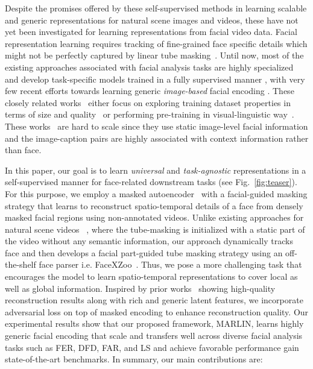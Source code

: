 \documentclass[10pt,twocolumn,letterpaper]{article}
\begin{document}
Despite the promises offered by these self-supervised methods in learning scalable and generic representations for natural scene images and videos, these have not yet been investigated for learning representations from facial video data. Facial representation learning requires tracking of  fine-grained face specific details which might not be perfectly captured by linear tube masking~\cite{tongVideoMAE2022}. Until now, most of the existing approaches associated with facial analysis tasks are highly specialized and develop task-specific models trained in a fully supervised manner \cite{schroffFaceNet2015,parkhiDeep2015,korshunovDeepFakes2018}, with very few recent efforts towards learning generic \textit{image-based} facial encoding \cite{zhengGeneral2022,bulatPretraining2022}. These closely related works~\cite{bulatPretraining2022,zhengGeneral2022} either focus on exploring training dataset properties in terms of size and quality~\cite{bulatPretraining2022} or performing pre-training in visual-linguistic way~\cite{zhengGeneral2022}. These works~\cite{bulatPretraining2022,zhengGeneral2022} are hard to scale since they use static image-level facial information and the image-caption pairs are highly associated with context information rather than face.

In this paper, our goal is to learn \textit{universal} and \textit{task-agnostic} representations in a self-supervised manner for face-related downstream tasks (see Fig.~\ref{fig:teaser}). For this purpose, we employ a masked autoencoder~\cite{heMasked2022,tongVideoMAE2022} with a facial-guided masking strategy that learns to reconstruct spatio-temporal details of a face from densely masked facial regions using non-annotated videos. Unlike existing approaches for natural scene videos ~\cite{tongVideoMAE2022}, where the tube-masking is initialized with a static part of the video without any semantic information, our approach dynamically tracks face and then develops a facial part-guided tube masking strategy using an off-the-shelf face parser i.e. FaceXZoo~\cite{wangFaceXZoo2021}. Thus, we pose a more challenging task that encourages the model to learn spatio-temporal representations to cover local as well as global information.
Inspired by prior works~\cite{radfordUnsupervised2016, donahueLarge2019} showing high-quality reconstruction results along with rich and generic latent features, we incorporate adversarial loss on top of masked encoding to enhance reconstruction quality. Our experimental results show that our proposed framework, MARLIN, learns highly generic facial encoding that scale and transfers well across diverse facial analysis tasks such as FER, DFD, FAR, and LS and achieve favorable performance gain \wrt state-of-the-art benchmarks. In summary, our main contributions are:
\end{document}
